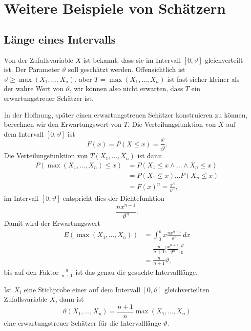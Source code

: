 \section{Weitere Beispiele von Schätzern} \label{section-weitere-beispiele-von-schaetzern}
\subsection{Länge eines Intervalls}
Von der Zufallsvariable $X$ ist bekannt, dass sie im Intervall $[0,\vartheta]$
gleichverteilt ist.
Der Parameter $\vartheta$ soll geschätzt werden.
Offensichtlich ist $\vartheta \ge \max(X_1,\dots,X_n)$,
aber $T=\max(X_1,\dots,X_n)$ ist fast sicher kleiner als der wahre
Wert von $\vartheta$, wir können also nicht erwarten, dass $T$ ein
erwartungstreuer Schätzer ist.

In der Hoffnung, später einen erwartungstreuen Schätzer konstruieren
zu können, berechnen wir den Erwartungswert von $T$.
Die Verteilungsfunktion von $X$ auf dem Intervall $[0,\vartheta]$ ist
\begin{equation}
F(x)=P(X\le x)= \frac{x}{\vartheta}.
\end{equation}
Die Verteilungsfunktion von $T(X_1,\dots,X_n)$ ist dann
\begin{align*}
P(\max(X_1,\dots,X_n)\le x)
&=
P(X_1\le x\wedge\dots\wedge X_n\le x)
\\
&=
P(X_1\le x)\dots P(X_n\le x)
\\
&=
F(x)^n=\frac{x^n}{\vartheta^n},
\end{align*}
im Intervall $[0,\vartheta]$ entspricht dies der Dichtefunktion
\begin{equation}
\frac{nx^{n-1}}{\vartheta^n}.
\end{equation}
Damit wird der Erwartungswert
\begin{align*}
E(\max(X_1,\dots,X_n))
&=
\int_0^{\vartheta}x\frac{nx^{n-1}}{\vartheta^n}\,dx
\\
&=
\frac{n}{n+1}\biggl[\frac{x^{n+1}}{\vartheta^n}\biggr]_0^\vartheta
\\
&=
\frac{n}{n+1}\vartheta,
\end{align*}
bis auf den Faktor $\frac{n}{n+1}$ ist das genau die gesuchte Intervalllänge.
\begin{satz}
Ist $X_i$ eine Stichprobe einer auf dem Intervall $[0,\vartheta]$
gleichverteilten Zufallsvariable $X$, dann ist
\begin{equation}
\vartheta(X_1,\dots,X_n)=\frac{n+1}{n}\max(X_1,\dots, X_n)
\end{equation}
eine erwartungstreuer Schätzer für die Intervalllänge $\vartheta$.
\end{satz}

